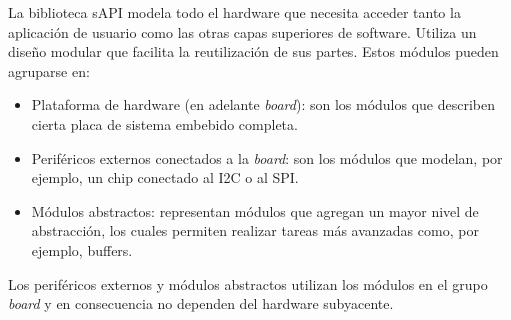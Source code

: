 La biblioteca sAPI modela todo el hardware que necesita acceder tanto la aplicación de usuario como las otras capas superiores de software. Utiliza un diseño modular que facilita la reutilización de sus partes. Estos módulos pueden agruparse en:

\begin{itemize}
\item
Plataforma de hardware (en adelante \emph{board}): son los módulos que describen cierta placa de sistema embebido completa.
\item
Periféricos externos conectados a la \emph{board}: son los módulos que modelan, por ejemplo, un chip conectado al I2C o al SPI.
\item
Módulos abstractos: representan módulos que agregan un mayor nivel de abstracción, los cuales permiten realizar tareas más avanzadas como, por ejemplo, buffers.
\end{itemize}

Los periféricos externos y módulos abstractos utilizan los módulos en el grupo \emph{board} y en consecuencia no dependen del hardware subyacente.
